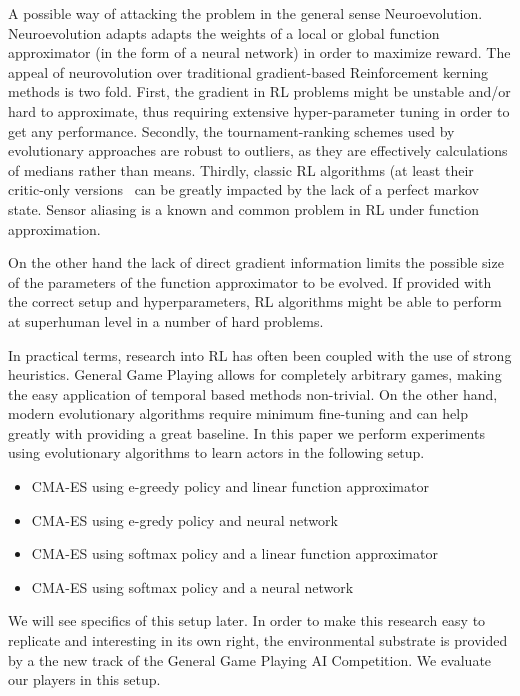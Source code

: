 \documentclass[conference]{IEEEtran}
\begin{document}
A possible way of attacking the problem in the general sense Neuroevolution\cite{neurocrap}. Neuroevolution adapts adapts the weights of a local or global function approximator (in the form of a neural network) in order to maximize reward. The appeal of neurovolution over traditional gradient-based Reinforcement kerning methods is two fold. First, the gradient in RL problems might be unstable and/or hard to approximate, thus requiring extensive hyper-parameter tuning in order to get any performance. Secondly, the tournament-ranking schemes used by evolutionary approaches are robust to outliers, as they are effectively calculations of medians rather than means. Thirdly, classic RL algorithms (at least their critic-only versions~\cite{jakollacrap} can be greatly impacted by the lack of a perfect markov state. Sensor aliasing is a known and common problem in RL under function approximation. 

On the other hand the lack of direct gradient information limits the possible size of the parameters of the function approximator to be evolved. If provided with the correct setup and hyperparameters, RL algorithms might be able to perform at superhuman level in a number of hard problems. 

In practical terms, research into RL has often been coupled with the use of strong heuristics. General Game Playing allows for completely arbitrary games, making the easy application of temporal based methods non-trivial. On the other hand, modern evolutionary algorithms require minimum fine-tuning and can help greatly with providing a great baseline. In this paper we perform experiments using evolutionary algorithms to learn actors in the following setup. 

\begin{itemize}
\item CMA-ES using e-greedy policy and linear function approximator 
\item CMA-ES using e-gredy policy and neural network
\item CMA-ES using softmax policy and a linear function approximator
\item CMA-ES using softmax policy and a neural network
\end{itemize}

We will see specifics of this setup later. In order to make this research easy to replicate and interesting in its own right, the environmental substrate is provided by a the new track of the General Game Playing AI Competition. We evaluate our players in this setup. 
\end{document}
